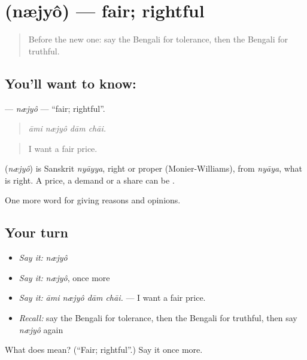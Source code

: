 \section[\texorpdfstring{\bn{ন্যায্য} (næjyô)}{ন্যায্য (næjyô)}]{ (næjyô) — fair; rightful}

\label{lesson:BN-C350-nejyo}



\begin{quote}
Before the new one: say the Bengali for tolerance, then the Bengali for truthful.
\end{quote}

\subsection*{You'll want to know: }
\textbf{} — \emph{næjyô} — \textquotedblleft{}fair; rightful\textquotedblright{}.

\begin{quote}
   
\end{quote}

\begin{quote}
\emph{āmi næjyô dām chāi.}
\end{quote}

\begin{quote}
I want a fair price.
\end{quote}

\begin{cousinweb}
\textbf{} (\emph{næjyô}) is Sanskrit \emph{nyāyya}, right or proper (Monier-Williams), from \emph{nyāya}, what is right. A price, a demand or a share can be .
\end{cousinweb}

\begin{grammarlens}[title={What you've built}]
One more word for giving reasons and opinions.
\end{grammarlens}

\subsection*{Your turn}
\begin{itemize}
\raggedright
  \item \emph{Say it:} \emph{næjyô}
  \item \emph{Say it:} \emph{næjyô}, once more
  \item \emph{Say it:} \emph{āmi næjyô dām chāi.} — I want a fair price.
  \item \emph{Recall:} say the Bengali for tolerance, then the Bengali for truthful, then say \emph{næjyô} again
\end{itemize}

\begin{tcolorbox}[breakable,colback=teal!4,colframe=teal!35!black,title={Before you move on}]
What does  mean? (\textquotedblleft{}Fair; rightful\textquotedblright{}.) Say it once more.
\end{tcolorbox}
